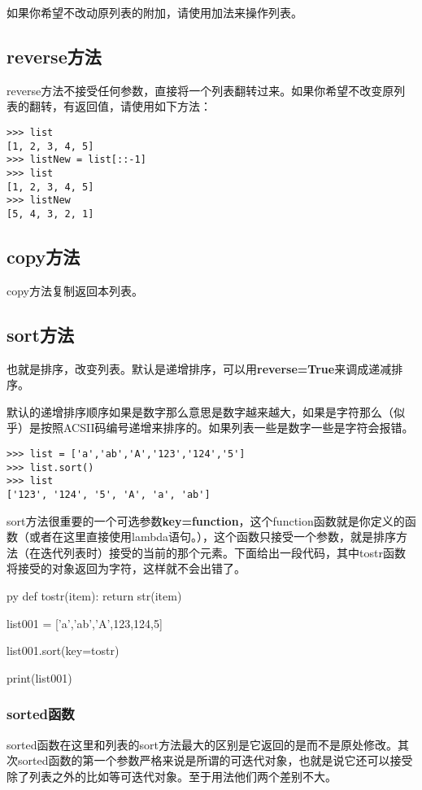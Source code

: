 \documentclass[12pt,oneside]{book}
\begin{document}
\begin{common-format}
如果你希望不改动原列表的附加，请使用加法来操作列表。

\subsection{reverse方法}
reverse方法不接受任何参数，直接将一个列表翻转过来。如果你希望不改变原列表的翻转，有返回值，请使用如下方法：
\begin{Verbatim}
>>> list
[1, 2, 3, 4, 5]
>>> listNew = list[::-1]
>>> list
[1, 2, 3, 4, 5]
>>> listNew
[5, 4, 3, 2, 1]
\end{Verbatim}

\subsection{copy方法}
copy方法复制返回本列表。


\subsection{sort方法}
也就是排序，改变列表。默认是递增排序，可以用\textbf{reverse=True}来调成递减排序。

默认的递增排序顺序如果是数字那么意思是数字越来越大，如果是字符那么（似乎）是按照ACSII码编号递增来排序的。如果列表一些是数字一些是字符会报错。
\begin{Verbatim}
>>> list = ['a','ab','A','123','124','5']
>>> list.sort()
>>> list
['123', '124', '5', 'A', 'a', 'ab']
\end{Verbatim}

sort方法很重要的一个可选参数\textbf{key=function}，这个function函数就是你定义的函数（或者在这里直接使用lambda语句。），这个函数只接受一个参数，就是排序方法（在迭代列表时）接受的当前的那个元素。下面给出一段代码，其中tostr函数将接受的对象返回为字符，这样就不会出错了。
\begin{xverbatim}[129]{py}
def tostr(item):
    return str(item)

list001 = ['a','ab','A',123,124,5]

list001.sort(key=tostr)

print(list001)
\end{xverbatim}

\subsubsection{sorted函数}
sorted函数在这里和列表的sort方法最大的区别是它返回的是而不是原处修改。其次sorted函数的第一个参数严格来说是所谓的可迭代对象，也就是说它还可以接受除了列表之外的比如等可迭代对象。至于用法他们两个差别不大。


\end{common-format}
\end{document}
